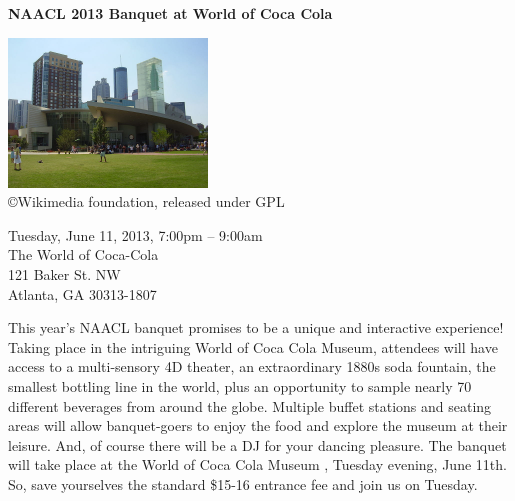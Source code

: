 \begin{center}

\begin{Large}
{\bfseries\Large NAACL 2013 Banquet at World of Coca Cola}\vspace{1em}\par
\end{Large}

\includegraphics[height=150px]{content/day3/cocacola.jpg} \\

{\tiny \copyright Wikimedia foundation, released under GPL}

Tuesday, June 11, 2013, 7:00pm -- 9:00am \vspace{1em}\\
The World of Coca-Cola\\
121 Baker St. NW\\
Atlanta, GA 30313-1807\\
\end{center}

\noindent
This year's NAACL banquet promises to be a unique and interactive experience! Taking place in the intriguing World of Coca Cola Museum, attendees will have access to a multi-sensory 4D theater, an extraordinary 1880s soda fountain, the smallest bottling line in the world, plus an opportunity to sample nearly 70 different beverages from around the globe. Multiple buffet stations and seating areas will allow banquet-goers to enjoy the food and explore the museum at their leisure. And, of course there will be a DJ for your dancing pleasure. The banquet will take place at the World of Coca Cola Museum , Tuesday evening, June 11th. So, save yourselves the standard \$15-16 entrance fee and join us on Tuesday.


\newpage
